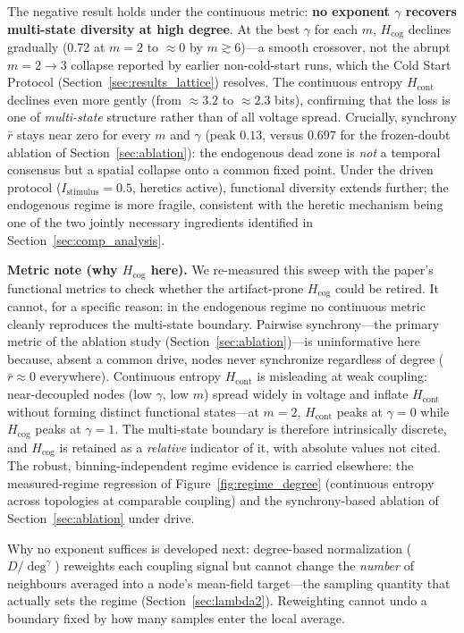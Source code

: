 ﻿\documentclass[11pt]{article}
\begin{document}
The negative result holds under the continuous metric: \textbf{no exponent $\gamma$ recovers multi-state diversity at high degree}. At the best $\gamma$ for each $m$, $H_{\text{cog}}$ declines gradually (0.72 at $m=2$ to $\approx 0$ by $m \gtrsim 6$)---a smooth crossover, not the abrupt $m=2 \to 3$ collapse reported by earlier non-cold-start runs, which the Cold Start Protocol (Section~\ref{sec:results_lattice}) resolves. The continuous entropy $H_{\text{cont}}$ declines even more gently (from $\approx 3.2$ to $\approx 2.3$ bits), confirming that the loss is one of \emph{multi-state} structure rather than of all voltage spread. Crucially, synchrony $\bar{r}$ stays near zero for every $m$ and $\gamma$ (peak $0.13$, versus $0.697$ for the frozen-doubt ablation of Section~\ref{sec:ablation}): the endogenous dead zone is \emph{not} a temporal consensus but a spatial collapse onto a common fixed point. Under the driven protocol ($I_{\text{stimulus}} = 0.5$, heretics active), functional diversity extends further; the endogenous regime is more fragile, consistent with the heretic mechanism being one of the two jointly necessary ingredients identified in Section~\ref{sec:comp_analysis}.

\textbf{Metric note (why $H_{\text{cog}}$ here).} We re-measured this sweep with the paper's functional metrics to check whether the artifact-prone $H_{\text{cog}}$ could be retired. It cannot, for a specific reason: in the endogenous regime no continuous metric cleanly reproduces the multi-state boundary. Pairwise synchrony---the primary metric of the ablation study (Section~\ref{sec:ablation})---is uninformative here because, absent a common drive, nodes never synchronize regardless of degree ($\bar{r} \approx 0$ everywhere). Continuous entropy $H_{\text{cont}}$ is misleading at weak coupling: near-decoupled nodes (low $\gamma$, low $m$) spread widely in voltage and inflate $H_{\text{cont}}$ without forming distinct functional states---at $m=2$, $H_{\text{cont}}$ peaks at $\gamma=0$ while $H_{\text{cog}}$ peaks at $\gamma=1$. The multi-state boundary is therefore intrinsically discrete, and $H_{\text{cog}}$ is retained as a \emph{relative} indicator of it, with absolute values not cited. The robust, binning-independent regime evidence is carried elsewhere: the measured-regime regression of Figure~\ref{fig:regime_degree} (continuous entropy across topologies at comparable coupling) and the synchrony-based ablation of Section~\ref{sec:ablation} under drive.

Why no exponent suffices is developed next: degree-based normalization ($D/\deg^\gamma$) reweights each coupling signal but cannot change the \emph{number} of neighbours averaged into a node's mean-field target---the sampling quantity that actually sets the regime (Section~\ref{sec:lambda2}). Reweighting cannot undo a boundary fixed by how many samples enter the local average.
\end{document}
